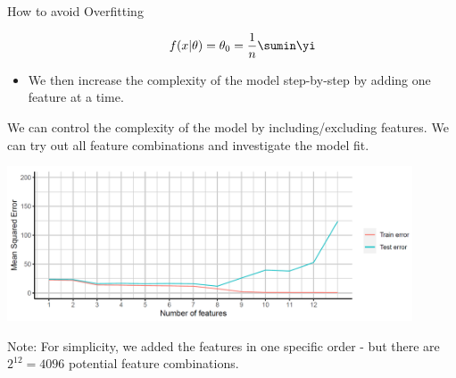 \begin{vbframe}{How to avoid Overfitting}
\begin{itemize}
\[
f(x | \theta) = \theta_0 = \frac{1}{n}\sumin \yi
\]

\item 
We then increase the complexity of the model step-by-step by adding one
feature at a time.

\end{itemize} 

\framebreak

We can control the complexity of the model by including/excluding
features. We can try out all feature combinations and investigate the
model fit.

\vfill

\begin{center}
\includegraphics[width=0.9\textwidth]{plots/regularization03.png}
\end{center}

Note: For simplicity, we added the features in one specific order - but there are $2^{12} = 4096$ potential feature combinations.
\end{vbframe}


